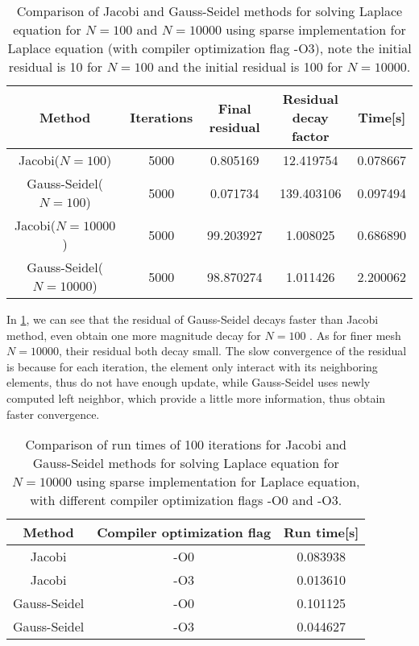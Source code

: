 \documentclass[10pt,a4paper]{article}
\theoremstyle{dotlessP}
\begin{document}
	\begin{table}[tbhp] 
	{\footnotesize
		\caption{Comparison of Jacobi and Gauss-Seidel methods for solving Laplace equation for $N=100$ and $N=10000$ using sparse implementation for Laplace equation (with compiler optimization flag -O3), note the initial residual is 10 for $N=100$ and the initial residual is 100 for $N=10000$. 
		}\label{tab:Laplace-sparse}
		\begin{center}
			\begin{tabular}{|c|c|c|c|c|}
				\hline 
				Method	& Iterations & Final residual & Residual decay factor &  Time[s]\\ 
				\hline 
				Jacobi($N=100$)	& 5000 & 0.805169  & 12.419754 &  0.078667  \\ 
				Gauss-Seidel($N=100$)	&  5000  & 0.071734  & 139.403106 & 0.097494 \\ 
				\hline 
			Jacobi($N=10000$)		& 5000 &   99.203927 & 1.008025 & 0.686890 \\ 
			Gauss-Seidel($N=10000$)	& 5000  & 98.870274  & 1.011426 & 2.200062 \\ 
				\hline 
			\end{tabular} 
		\end{center}
	}
\end{table}

In \cref{tab:Laplace-sparse}, we can see that the residual of Gauss-Seidel decays faster than Jacobi method, even obtain one more magnitude decay for $N=100$ . As for finer mesh $N=10000$, their residual both decay small. The slow convergence of the residual is because for each iteration, the element only interact with its neighboring elements, thus do not have enough update, while Gauss-Seidel uses newly computed left neighbor, which provide a little more information, thus obtain faster convergence. 


	\begin{table}[tbhp] 
	{\footnotesize
		\caption{Comparison of run times of 100 iterations for Jacobi and Gauss-Seidel methods for solving Laplace equation for $N=10000$ using sparse implementation for Laplace equation, with different compiler optimization flags -O0 and -O3.
		}\label{tab:Laplace-time}
		\begin{center}
			\begin{tabular}{|c|c|c|}
				\hline 
				Method	& Compiler optimization flag & Run time[s]\\ 
				\hline 
  Jacobi & -O0 & 0.083938\\
 Jacobi & -O3 &  0.013610\\
  \hline
  Gauss-Seidel &-O0 & 0.101125\\
  Gauss-Seidel &-O3 & 0.044627\\
				\hline 
			\end{tabular} 
		\end{center}
	}
\end{table}
\end{document}
